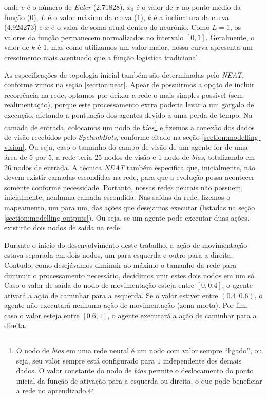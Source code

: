 onde $e$ é o número de \textit{Euler} (2.71828), $x_{0}$ é o valor de $x$ no
ponto médio da função (0), $L$ é o valor máximo da curva (1), $k$ é a
inclinatura da curva (4.924273) e $x$ é o valor de soma atual dentro do
neurônio. Como $L=1$, os valores da função permanecem normalizados no intervalo
$[0,1]$. Geralmente, o valor de $k$ é $1$, mas como utilizamos um valor maior,
nossa curva apresenta um crescimento mais acentuado que a função logística
tradicional.

As especificações de topologia inicial também são determinadas pelo
\textit{NEAT}, conforme vimos na seção \ref{section:neat}. Apear de possuirmos a
opção de incluir recorrência na rede, optamos por deixar a rede o mais simples
possível (sem realimentação), porque este processamento extra poderia levar a um
gargalo de execução, afetando a pontuação dos agentes devido a uma perda de
tempo. Na camada de entrada, colocamos um nodo de \textit{bias}\footnote{O nodo
de \textit{bias} em uma rede neural é um nodo com valor sempre ``ligado'',
ou seja, seu valor sempre está configurado para $1$ independente dos demais
dados.  O valor constante do nodo de \textit{bias} permite o deslocamento do
ponto inicial da função de ativação para a esquerda ou direita, o que pode
beneficiar a rede no aprendizado.} e  fizemos a conexão dos dados de visão
recebidos pelo \textit{SpelunkBots}, conforme citado na seção
\ref{section:modelling-vision}. Ou seja, caso o tamanho do campo de visão de um
agente for de uma área de 5 por 5, a rede teria 25 nodos de visão e 1 nodo de
\textit{bias}, totalizando em 26 nodos de entrada. A técnica \textit{NEAT}
também especifica que, inicialmente, não devem existir camadas escondidas na
rede, para que a evolução possa acontecer somente conforme necessidade.
Portanto, nossas redes neurais não possuem, inicialmente, nenhuma camada
escondida. Nas saídas da rede, fizemos o mapeamento, um para um, das ações que
desejamos executar (listadas na seção \ref{section:modelling-outputs}).  Ou
seja, se um agente pode executar duas ações, existirão dois nodos de saída na
rede.

Durante o início do desenvolvimento deste trabalho, a ação de movimentação
estava separada em dois nodos, um para esquerda e outro para a direita. Contudo,
como desejávamos diminuir ao máximo o tamanho da rede para diminuir o
processamento necessário, decidimos unir estes dois nodos em um só. Caso o valor
de saída do nodo de movimentação esteja entre $[0,0.4]$, o agente ativará a ação
de caminhar para a esquerda. Se o valor estiver entre $(0.4,0.6)$, o agente não
executará nenhuma ação de movimentação (zona morta). Por fim, caso o valor
esteja entre $[0.6,1]$, o agente executará a ação de caminhar para a direita.

